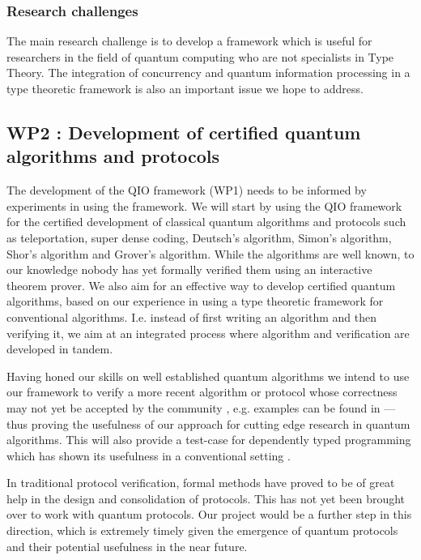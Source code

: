 \documentclass[a4paper]{article}
\begin{document}
\subsubsection*{Research challenges}
\label{sec:rsearch-challenges}

The main research challenge is to develop a framework which is useful for
researchers in the field of quantum computing who are not specialists
in Type Theory. The integration of concurrency and quantum information
processing in a type theoretic framework is also an important issue 
we hope to address.

\subsection*{WP2 : Development of certified quantum algorithms and protocols }
\label{sec:wp2}

The development of the QIO framework (WP1) needs to be informed by
experiments in using the framework. 
We will start by using the QIO framework for the
certified development of classical quantum algorithms and protocols
such as teleportation, super dense coding, Deutsch's algorithm,
Simon's algorithm, Shor's algorithm and Grover's algorithm. While the
algorithms are well known, to our knowledge nobody has yet formally
verified them using an interactive theorem prover. We also aim for an
effective way to develop certified quantum algorithms, based on our
experience in using a type theoretic framework for conventional
algorithms. I.e. instead of first writing an algorithm and then
verifying it, we aim at an integrated process where algorithm and
verification are developed in tandem.

Having honed our skills on well established quantum algorithms we
intend to use our framework to verify a more recent algorithm or
protocol whose correctness may not yet be accepted by the community ,
e.g.  examples can be found in  ---
thus proving the usefulness of our approach for cutting edge research
in quantum algorithms. This will also provide a test-case for
dependently typed programming which has shown its usefulness in a
conventional setting .

In traditional protocol verification, formal methods have proved to be
of great help in the design and  consolidation of protocols. This has
not yet been brought over to work with quantum protocols. Our project
would be a further step in this direction, which is extremely timely
given the emergence of quantum protocols and their potential
usefulness in the near future.
\end{document}

